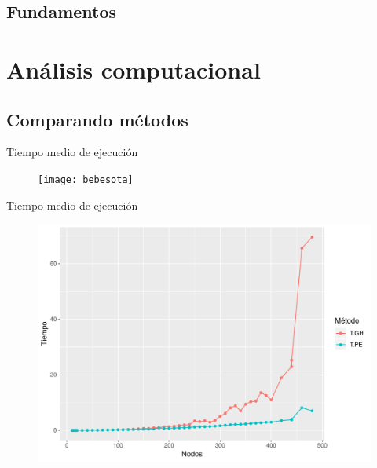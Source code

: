 \documentclass{beamer}
\begin{document}
\subsection{Fundamentos}
\begin{frame}

\end{frame}

\section{Análisis computacional}
\subsection{Comparando métodos}
\begin{frame}{Tiempo medio de ejecución}
\begin{figure}[h!]
\centering
\texttt{[image: bebesota]}
\end{figure}
\end{frame}

\begin{frame}{Tiempo medio de ejecución}
\begin{figure}[h!]
\centering
\includegraphics[scale=0.45]{plot3}
\end{figure}
\end{frame}
\end{document}
